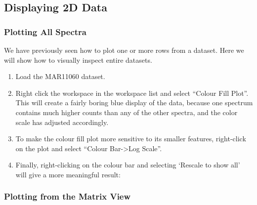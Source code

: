 \documentclass[letterpaper,10pt,english,openany]{sphinxmanual}
\begin{document}
\subsection{Displaying 2D Data}
\label{\detokenize{mantid_basic_course/loading_and_displaying_data/04_displaying_2D_data:displaying-2d-data}}\label{\detokenize{mantid_basic_course/loading_and_displaying_data/04_displaying_2D_data:id1}}\label{\detokenize{mantid_basic_course/loading_and_displaying_data/04_displaying_2D_data::doc}}

\subsubsection{Plotting All Spectra}
\label{\detokenize{mantid_basic_course/loading_and_displaying_data/04_displaying_2D_data:plotting-all-spectra}}
We have previously seen how to plot one or more rows from a dataset.
Here we will show how to visually inspect entire datasets.
\begin{enumerate}
\def\theenumi{\arabic{enumi}}
\def\labelenumi{\theenumi .}
\makeatletter\def\p@enumii{\p@enumi \theenumi .}\makeatother
\item {} 
Load the MAR11060 dataset.

\item {} 
Right click the workspace in the workspace list and select “Colour
Fill Plot”. This will create a fairly boring blue display of the
data, because one spectrum contains much higher counts than any of
the other spectra, and the color scale has adjusted accordingly.

\item {} 
To make the colour fill plot more sensitive to its smaller features,
right-click on the plot and select “Colour Bar-\textgreater{}Log Scale”.

\item {} 
Finally, right-clicking on the colour bar and selecting ‘Rescale to
show all’ will give a more meaningful result:

\end{enumerate}

\begin{figure}[H]
\centering

\noindent{}
\end{figure}


\subsubsection{Plotting from the Matrix View}
\label{\detokenize{mantid_basic_course/loading_and_displaying_data/04_displaying_2D_data:plotting-from-the-matrix-view}}
\begin{figure}[H]
\centering

\noindent{}
\end{figure}
\end{document}
